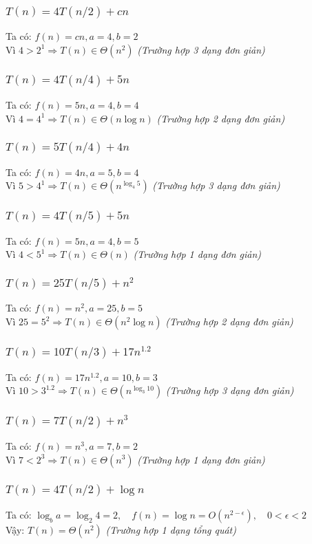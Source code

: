 \subsubsection{$T(n) = 4T(n/2) + cn$}
Ta có: $f(n) = cn, a=4,b=2$\\
Vì $4 > 2^1 \Rightarrow T(n) \in \Theta(n^2)$ \textit{(Trường hợp 3 dạng đơn giản)}
\subsubsection{$T(n) = 4T(n/4) + 5n$}
Ta có: $f(n) = 5n, a=4,b=4$\\
Vì $4 = 4^1 \Rightarrow T(n) \in \Theta(n\log n)$ \textit{(Trường hợp 2 dạng đơn giản)}
\subsubsection{$T(n) = 5T(n/4) + 4n$}
Ta có: $f(n) = 4n, a=5,b=4$\\
Vì $5 > 4^1 \Rightarrow T(n) \in \Theta(n^{\log_4 5})$ \textit{(Trường hợp 3 dạng đơn giản)}
\subsubsection{$T(n) = 4T(n/5) + 5n$}
Ta có: $f(n) = 5n, a=4,b=5$\\
Vì $4 < 5^1 \Rightarrow T(n) \in \Theta(n)$ \textit{(Trường hợp 1 dạng đơn giản)}
\subsubsection{$T(n) = 25T(n/5) + n^2$}
Ta có: $f(n) = n^2, a=25,b=5$\\
Vì $25 = 5^2 \Rightarrow T(n) \in \Theta(n^2\log n)$ \textit{(Trường hợp 2 dạng đơn giản)}
\subsubsection{$T(n) = 10T(n/3) + 17n^{1.2}$}
Ta có: $f(n) = 17n^{1.2}, a=10,b=3$\\
Vì $10 > 3^{1.2} \Rightarrow T(n) \in \Theta(n^{\log_3 10})$ \textit{(Trường hợp 3 dạng đơn giản)}
\subsubsection{$T(n) = 7T(n/2) + n^3$}
Ta có: $f(n) = n^3, a=7,b=2$\\
Vì $7 < 2^3 \Rightarrow T(n) \in \Theta(n^3)$ \textit{(Trường hợp 1 dạng đơn giản)}
\subsubsection{$T(n) = 4T(n/2) + \log n$}
Ta có: $\log_b a = \log_2 4 = 2, \quad f(n) = \log n = O(n^{2-\epsilon}),\quad 0 < \epsilon < 2 $ \\
Vậy: $T(n) = \Theta(n^2)$ \textit{(Trường hợp 1 dạng tổng quát)}
